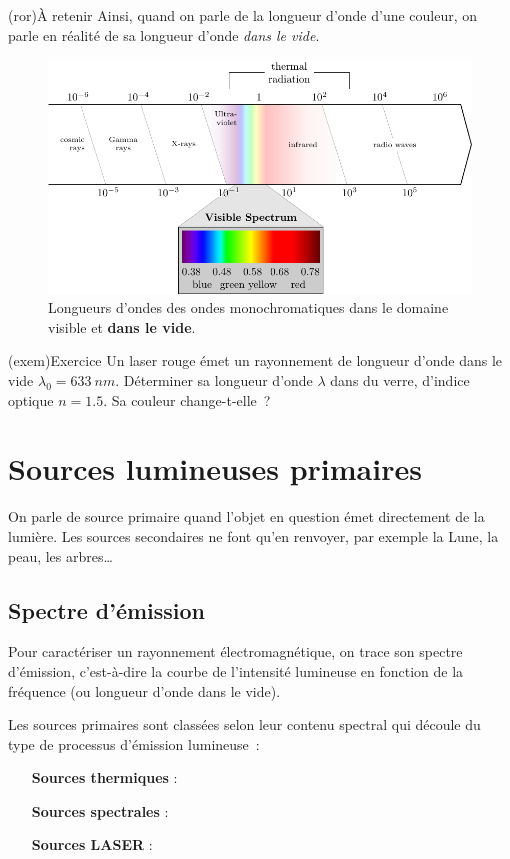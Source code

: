 \documentclass[../../main/main.tex]{subfiles}
\begin{document}
\begin{tcb}(ror){À retenir}
	Ainsi, quand on parle de la longueur d'onde d'une couleur, on parle en réalité
	de sa longueur d'onde \textit{dans le vide}.
\end{tcb}

\begin{figure}[h]
	\centering
	\includegraphics[width=.7\linewidth]{full_spectre}
	\caption{Longueurs d'ondes des ondes monochromatiques dans le domaine
		visible et \textbf{dans le vide}.}
	\label{fig:lambda_vis}
\end{figure}

\begin{tcb}(exem){Exercice}
	Un laser rouge émet un rayonnement de longueur d'onde dans le vide
	$\lambda_0 = \SI{633}{nm}$. Déterminer sa longueur d'onde $\lambda$ dans du
	verre, d'indice optique $n = \num{1.5}$. Sa couleur change-t-elle~?
	\tcblower

\end{tcb}

\section{Sources lumineuses primaires}

On parle de source primaire quand l'objet en question émet directement de la
lumière. Les sources secondaires ne font qu'en renvoyer, par exemple la Lune, la
peau, les arbres…

\subsection{Spectre d'émission}

Pour caractériser un rayonnement électromagnétique, on trace son spectre
d'émission, c'est-à-dire la courbe de l'intensité lumineuse en fonction de la
fréquence (ou longueur d'onde dans le vide).

Les sources primaires sont classées selon leur contenu spectral
qui découle du type de processus d'émission lumineuse~:
\begin{itemize}[leftmargin=120pt]
	\item[\textbf{Sources thermiques}] : 
	\item[\textbf{Sources spectrales}] : 
	\item[\textbf{Sources LASER}] : 
\end{itemize}
\end{document}
